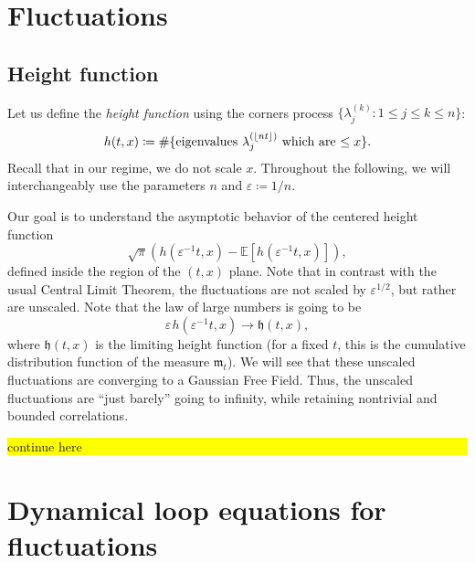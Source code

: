 \documentclass[letterpaper,11pt,oneside,reqno]{article}
\numberwithin{equation}{section}
\newcommand{\ssp}{\hspace{1pt}}
\theoremstyle{definition}
\begin{document}
\section{Fluctuations}

\subsection{Height function}

Let us define the \emph{height function} using the corners process
$\{ \lambda^{(k)}_j\colon 1\le j\le k\le n \}$:
\begin{equation*}
	h(t,x)\coloneqq \#
	\{ \textnormal{eigenvalues $\lambda^{(\lfloor nt \rfloor )}_j$ which 
	are $\leq x$} \}.
\end{equation*}
Recall that in our regime, we do not scale $x$.
Throughout the following, we will interchangeably use
the parameters $n$ and
$\varepsilon\coloneqq 1/n$.

Our goal is to understand the asymptotic behavior of the centered height function
$$
\sqrt{\pi}\left(
h(\varepsilon^{-1}t, x) - \mathbb{E}[h(\varepsilon^{-1}t, x)]
\right),
$$
defined inside the region of the $(t,x)$ plane.
Note that in contrast with the usual Central Limit Theorem,
the fluctuations are not scaled by $\varepsilon^{1/2}$, 
but rather are unscaled. 
Note that the law of large numbers is going to be
\begin{equation*}
	\varepsilon
	\ssp h(\varepsilon^{-1}t, x) \to
	\mathfrak{h}(t,x),
\end{equation*}
where $\mathfrak{h}(t,x)$ is the limiting height function
(for a fixed $t$, this is the cumulative distribution function
of the measure $\mathfrak{m}_t$).
We will see that these unscaled fluctuations are
converging to a Gaussian Free Field. Thus,
the unscaled fluctuations
are ``just barely'' going to infinity,
while retaining nontrivial and bounded correlations.

\colorbox{yellow}{\parbox{.7\textwidth}{continue here}}










\newpage



\section{Dynamical loop equations for fluctuations}
\end{document}
